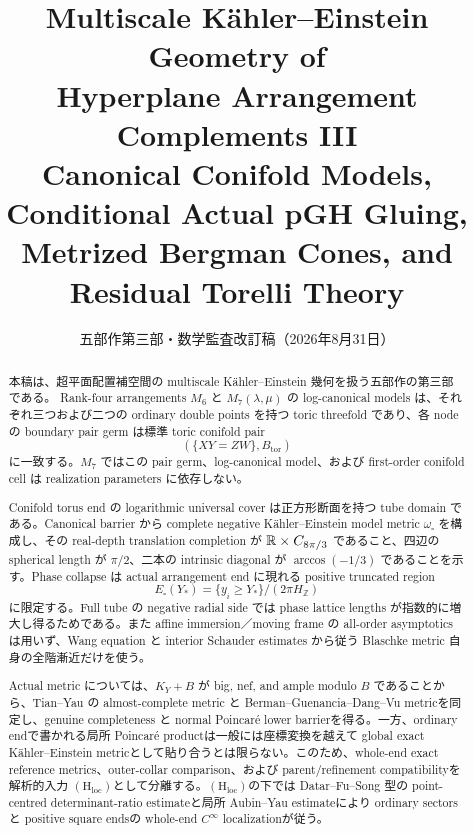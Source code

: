 \documentclass[11pt,a4paper]{ltjsarticle}
\title{\bfseries Multiscale K\"ahler--Einstein Geometry of\\
Hyperplane Arrangement Complements III\\[2mm]
\large Canonical Conifold Models, Conditional Actual pGH Gluing,\\
Metrized Bergman Cones, and Residual Torelli Theory}
\author{}
\date{五部作第三部・数学監査改訂稿（2026年8月31日）}
\newcommand{\ZZ}{\mathbb Z}\newcommand{\dd}{\mathrm d}\newcommand{\Ric}{\operatorname{Ric}}
\newcommand{\Hloc}{\ensuremath{(\mathrm H_{\mathrm{loc}})}}
\theoremstyle{plain}
\theoremstyle{definition}
\theoremstyle{remark}
\begin{document}
\maketitle

\begin{abstract}
本稿は、超平面配置補空間の multiscale K\"ahler--Einstein 幾何を扱う五部作の第三部である。
Rank-four arrangements $M_6$ と $M_7(\lambda,\mu)$ の log-canonical models は、それぞれ三つおよび二つの ordinary double points を持つ toric threefold であり、各 node の boundary pair germ は標準 toric conifold pair
\[
 (\{XY=ZW\},B_{\mathrm{tor}})
\]
に一致する。$M_7$ ではこの pair germ、log-canonical model、および first-order conifold cell は realization parameters に依存しない。

Conifold torus end の logarithmic universal cover は正方形断面を持つ tube domain である。Canonical barrier から complete negative K\"ahler--Einstein model metric $\omega_{\square}$ を構成し、その real-depth translation completion が $\mathbb R\times C_{8\pi/3}$ であること、四辺の spherical length が $\pi/2$、二本の intrinsic diagonal が $\arccos(-1/3)$ であることを示す。Phase collapse は actual arrangement end に現れる positive truncated region
\[
 E_{\square}(Y_*)=\{y_i\ge Y_*\}/(2\pi H_{\ZZ})
\]
に限定する。Full tube の negative radial side では phase lattice lengths が指数的に増大し得るためである。また affine immersion／moving frame の all-order asymptotics は用いず、Wang equation と interior Schauder estimates から従う Blaschke metric 自身の全階漸近だけを使う。

Actual metric については、$K_Y+B$ が big, nef, and ample modulo $B$ であることから、Tian--Yau の almost-complete metric と Berman--Guenancia--Dang--Vu metricを同定し、genuine completeness と normal Poincar\'e lower barrierを得る。一方、ordinary endで書かれる局所 Poincar\'e productは一般には座標変換を越えて global exact K\"ahler--Einstein metricとして貼り合うとは限らない。このため、whole-end exact reference metrics、outer-collar comparison、および parent/refinement compatibilityを解析的入力 \Hloc として分離する。\Hloc の下では Datar--Fu--Song 型の point-centred determinant-ratio estimateと局所 Aubin--Yau estimateにより ordinary sectors と positive square endsの whole-end $C^\infty$ localizationが従う。


\end{abstract}
\end{document}
